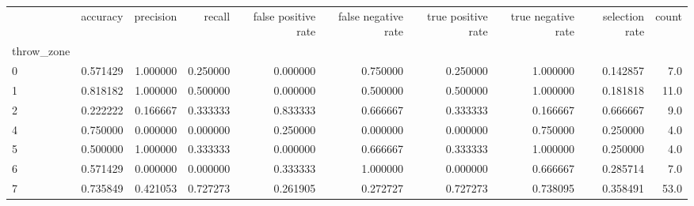 \begin{tabular}{lrrrrrrrrr}
\toprule
{} &  accuracy &  precision &    recall &  false positive rate &  false negative rate &  true positive rate &  true negative rate &  selection rate &  count \\
throw\_zone &           &            &           &                      &                      &                     &                     &                 &        \\
\midrule
0          &  0.571429 &   1.000000 &  0.250000 &             0.000000 &             0.750000 &            0.250000 &            1.000000 &        0.142857 &    7.0 \\
1          &  0.818182 &   1.000000 &  0.500000 &             0.000000 &             0.500000 &            0.500000 &            1.000000 &        0.181818 &   11.0 \\
2          &  0.222222 &   0.166667 &  0.333333 &             0.833333 &             0.666667 &            0.333333 &            0.166667 &        0.666667 &    9.0 \\
4          &  0.750000 &   0.000000 &  0.000000 &             0.250000 &             0.000000 &            0.000000 &            0.750000 &        0.250000 &    4.0 \\
5          &  0.500000 &   1.000000 &  0.333333 &             0.000000 &             0.666667 &            0.333333 &            1.000000 &        0.250000 &    4.0 \\
6          &  0.571429 &   0.000000 &  0.000000 &             0.333333 &             1.000000 &            0.000000 &            0.666667 &        0.285714 &    7.0 \\
7          &  0.735849 &   0.421053 &  0.727273 &             0.261905 &             0.272727 &            0.727273 &            0.738095 &        0.358491 &   53.0 \\
\bottomrule
\end{tabular}
